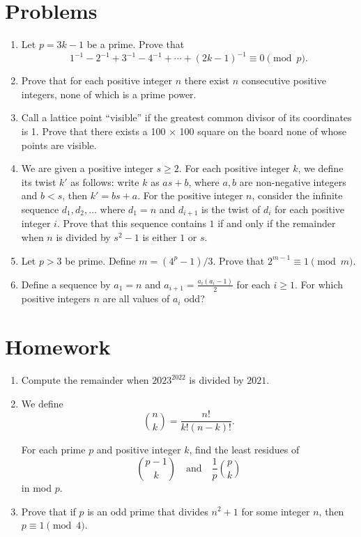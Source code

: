 \documentclass{article}
\begin{document}
\section{Problems}
\begin{enumerate}
	\item Let $p=3k-1$ be a prime. Prove that
	      \[1^{-1}-2^{-1}+3^{-1}-4^{-1}+\cdots+(2k-1)^{-1}\equiv 0\pmod p.\]
	\item Prove that for each positive integer $n$ there exist $n$ consecutive
	      positive integers, none of which is a prime power.
	\item Call a lattice point ``visible'' if the greatest
	      common divisor of its coordinates is 1. Prove that there exists a 100 × 100
	      square on the board none of whose points are visible.
	\item We are given a positive integer $s \ge 2$. For each positive integer
	      $k$, we define its twist $k'$ as follows: write $k$ as $as+b$, where $a, b$
	      are non-negative integers and $b < s$, then $k' = bs+a$. For the positive
	      integer $n$, consider the infinite sequence $d_1, d_2, \dots$ where $d_1=n$
	      and $d_{i+1}$ is the twist of $d_i$ for each positive integer $i$.
	      Prove that this sequence contains $1$ if and only if the remainder when $n$
	      is divided by $s^2-1$ is either $1$ or $s$.
	\item Let $p>3$ be prime. Define $m=(4^p-1)/3$. Prove that $2^{m-1}\equiv
		      1\pmod m$.
	\item Define a sequence by $a_1=n$ and $a_{i+1}=\frac{a_i(a_i-1)}2$ for each
	      $i\ge 1$. For which positive integers $n$ are all values of $a_i$ odd?
\end{enumerate}
\newpage
\section{Homework}
\begin{enumerate}
	\item Compute the remainder when $2023^{2022}$ is divided by $2021$.
	\item
	      We define
	      \[\binom nk=\frac{n!}{k!(n-k)!}.\]

	      For each prime $p$ and positive integer $k$, find the least residues of
	      \[\binom {p-1}k\quad\text{and}\quad\frac1p\binom pk\] in mod $p$.
	\item Prove that if $p$ is an odd prime that divides $n^2+1$ for some integer
	      $n$, then $p\equiv 1\pmod 4$.
\end{enumerate}
\end{document}

